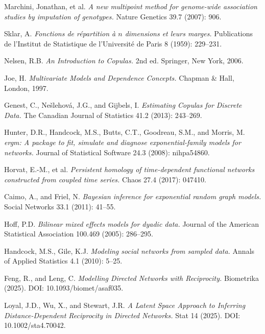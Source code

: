 

Marchini, Jonathan, et al.
\textit{A new multipoint method for genome-wide association studies by imputation of genotypes.}
Nature Genetics 39.7 (2007): 906.


Sklar, A.
\textit{Fonctions de r\'{e}partition \`{a} $n$ dimensions et leurs marges.}
Publications de l'Institut de Statistique de l'Universit\'{e} de Paris 8 (1959): 229--231.

Nelsen, R.B.
\textit{An Introduction to Copulas.}
2nd ed. Springer, New York, 2006.

Joe, H.
\textit{Multivariate Models and Dependence Concepts.}
Chapman \& Hall, London, 1997.

Genest, C., Ne\v{s}lehov\'{a}, J.G., and Gijbels, I.
\textit{Estimating Copulas for Discrete Data.}
The Canadian Journal of Statistics 41.2 (2013): 243--269.


Hunter, D.R., Handcock, M.S., Butts, C.T., Goodreau, S.M., and Morris, M.
\textit{ergm: A package to fit, simulate and diagnose exponential-family models for networks.}
Journal of Statistical Software 24.3 (2008): nihpa54860.

Horvat, E.-M., et al.
\textit{Persistent homology of time-dependent functional networks constructed from coupled time series.}
Chaos 27.4 (2017): 047410.

Caimo, A., and Friel, N.
\textit{Bayesian inference for exponential random graph models.}
Social Networks 33.1 (2011): 41--55.

Hoff, P.D.
\textit{Bilinear mixed effects models for dyadic data.}
Journal of the American Statistical Association 100.469 (2005): 286--295.

Handcock, M.S., Gile, K.J.
\textit{Modeling social networks from sampled data.}
Annals of Applied Statistics 4.1 (2010): 5--25.

Feng, R., and Leng, C.
\textit{Modelling Directed Networks with Reciprocity.}
Biometrika (2025). DOI: 10.1093/biomet/asaf035.

Loyal, J.D., Wu, X., and Stewart, J.R.
\textit{A Latent Space Approach to Inferring Distance-Dependent Reciprocity in Directed Networks.}
Stat 14 (2025). DOI: 10.1002/sta4.70042.

